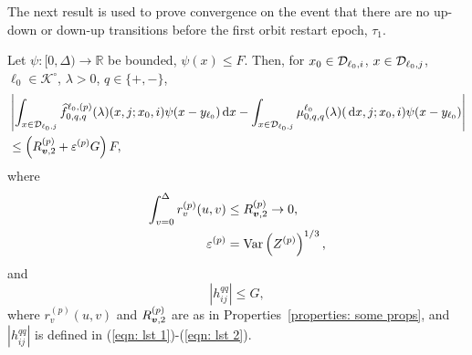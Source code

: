  The next result is used to prove convergence on the event that there are no up-down or down-up transitions before the first orbit restart epoch, \(\tau_1\).
 \begin{lem}\label{lem: Dcoajc}
	Let \(\psi:[0,\Delta)\to \mathbb R\) be bounded, \(\psi(x)\leq F\). Then, for \(x_0\in\mathcal{D}_{\ell_0,i}\), \(x\in\mathcal{D}_{\ell_0,j}\), \(\ell_0\in\mathcal K^\circ\), \(\lambda > 0\), \(q\in\{+,-\}\), 
	\begin{align}
		&\left|\int_{x\in\mathcal D_{\ell_0,j}} \widehat f^{\ell_0,(p)}_{0,q,q}(\lambda)(x,j; x_0,i)\psi(x-y_{\ell_0})\, \mathrm{d} x - \int_{x\in\mathcal D_{\ell_0,j}} \mu^{\ell_0}_{0,q,q}(\lambda)(\, \mathrm{d} x,j; x_0,i)\psi(x-y_{\ell_0})\right| \nonumber 
		\\&\leq \left(R_{{\boldsymbol v},2}^{(p)} + \varepsilon^{(p)}G\right) F,
		\label{eqn: anue}
	\end{align} 
	where 
	\begin{align*}\int_{v=0}^\Delta r_v^{(p)}(u,v) &\leq R_{{\boldsymbol v},2}^{(p)} \to 0,
	 \\\varepsilon^{(p)}&=\mathrm{Var}\left(Z^{(p)}\right)^{1/3},
	\end{align*}
	and 
	\[|h_{ij}^{qq}|\leq G,\] 
	where \(r_v^{(p)}(u,v)\) and \(R_{{\boldsymbol v},2}^{(p)}\) are as in Properties~\ref{properties: some props}, and \(|h_{ij}^{qq}|\) is defined in (\ref{eqn: lst 1})-(\ref{eqn: lst 2}). 
\end{lem}
